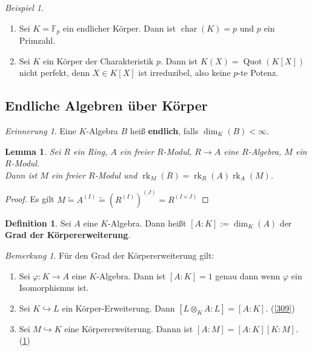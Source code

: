 \documentclass[10pt,a4paper]{article}
\newcommand{\F}{\ensuremath{\mathbb{F}}}
\newcommand{\isomorph}{\ensuremath{\tilde{=}}}
\newcommand{\Quot}{\operatorname{Quot}}
\newcommand{\cha}{\ensuremath{\operatorname{char}}}
\newcommand{\rk}{\ensuremath{\operatorname{rk}}}
\newcounter{thm}[section]
\theoremstyle{definition}
\newtheorem{definition}[thm]{Definition}
\theoremstyle{plain}
\newtheorem{lem}[thm]{Lemma}
\theoremstyle{remark}
\newtheorem*{bem*}{Bemerkung}
\newtheorem{rem}[thm]{Erinnerung}
\newtheorem{exm}[thm]{Beispiel}
\begin{document}
\begin{exm}
	\begin{enumerate}
		\item Sei $K=\F_p$ ein endlicher Körper. Dann ist $\cha(K)=p$ und $p$ ein Primzahl.
		\item Sei $K$ ein Körper der Charakteristik $p$. Dann ist $K(X)=\Quot(K[X])$ nicht perfekt, denn $X\in K[X]$ ist irreduzibel, also keine $p$-te Potenz.
	\end{enumerate}
\end{exm}




\subsection{Endliche Algebren über Körper}

\begin{rem}
	Eine $K$-Algebra $B$ heiß \textbf{endlich}, falls $\dim_K(B)<\infty$.
\end{rem}

\addtocounter{thm}{-1}
\begin{lem}\label{810lem}
	Sei $R$ ein Ring, $A$ ein freier $R$-Modul, $R\to A$ eine $R$-Algebra, $M$ ein $R$-Modul.\\
	Dann ist $M$ ein freier $R$-Modul und $\rk_M(R)=\rk_R(A)\rk_A(M)$.
\end{lem}
\begin{proof}
	Es gilt $M\isomorph A^{(I)}\isomorph (R^{(I)})^{(J)}=R^{(I\times J)}$
\end{proof}

\begin{definition}
	Sei $A$ eine $K$-Algebra. Dann heißt $[A:K]:=\dim_K(A)$ der \textbf{Grad der Körpererweiterung}.
\end{definition}
\begin{bem*}
	Für den Grad der Körpererweiterung gilt:
	\begin{enumerate}
		\item Sei $\varphi:K\to A$ eine $K$-Algebra. Dann ist $[A:K]=1$ genau dann wenn $\varphi$ ein Isomorphismus ist.
		\item Sei $K\hookrightarrow L$ ein Körper-Erweiterung. Dann $[L\otimes_K A:L]=[A:K]$. (\ref{309})
		\item Sei $M\hookrightarrow K$ eine Körpererweiterung. Dannn ist $[A:M]=[A:K][K:M]$. (\ref{810lem}) 
	\end{enumerate}
\end{bem*}
\end{document}
